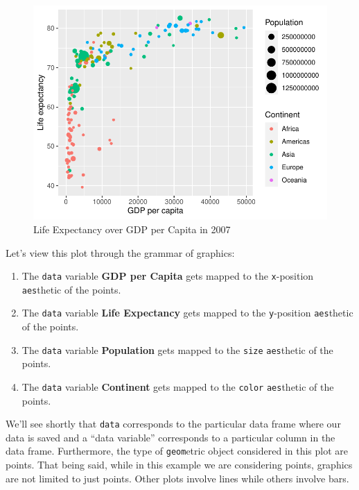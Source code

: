 \documentclass[
  letterpaper,
  DIV=11,
  numbers=noendperiod]{scrreprt}
\providecommand{\tightlist}{%
  \setlength{\itemsep}{0pt}\setlength{\parskip}{0pt}}\usepackage{longtable,booktabs,array}
\theoremstyle{definition}
\theoremstyle{remark}
\begin{document}
\begin{figure}

{\centering \includegraphics{02-visualization_files/figure-pdf/fig-gapminder-1.pdf}

}

\caption{\label{fig-gapminder}Life Expectancy over GDP per Capita in
2007}

\end{figure}

Let's view this plot through the grammar of graphics:

\begin{enumerate}
\def\labelenumi{\arabic{enumi}.}
\tightlist
\item
  The \texttt{data} variable \textbf{GDP per Capita} gets mapped to the
  \texttt{x}-position \texttt{aes}thetic of the points.
\item
  The \texttt{data} variable \textbf{Life Expectancy} gets mapped to the
  \texttt{y}-position \texttt{aes}thetic of the points.
\item
  The \texttt{data} variable \textbf{Population} gets mapped to the
  \texttt{size} \texttt{aes}thetic of the points.
\item
  The \texttt{data} variable \textbf{Continent} gets mapped to the
  \texttt{color} \texttt{aes}thetic of the points.
\end{enumerate}

We'll see shortly that \texttt{data} corresponds to the particular data
frame where our data is saved and a ``data variable'' corresponds to a
particular column in the data frame. Furthermore, the type of
\texttt{geom}etric object considered in this plot are points. That being
said, while in this example we are considering points, graphics are not
limited to just points. Other plots involve lines while others involve
bars.
\end{document}

